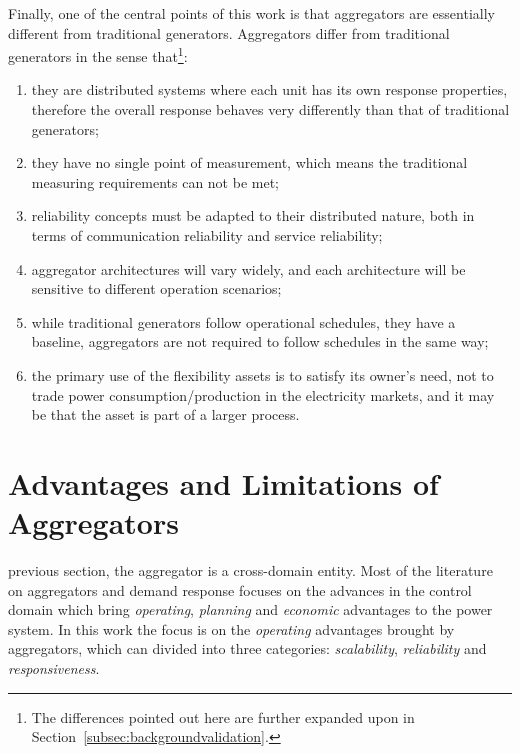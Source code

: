 Finally, one of the central points of this work is that aggregators are essentially different from traditional generators. Aggregators differ from traditional generators in the sense that\footnote{The differences pointed out here are further expanded upon in Section~\ref{subsec:backgroundvalidation}.}:
\begin{enumerate}
	\item they are distributed systems where each unit has its own response properties, therefore the overall response behaves very differently than that of traditional generators;\label{point:aggblackbox}
	\item they have no single point of measurement, which means the traditional measuring requirements can not be met;
	\item reliability concepts must be adapted to their distributed nature, both in terms of communication reliability and service reliability;
	\item aggregator architectures will vary widely, and each architecture will be sensitive to different operation scenarios;
	\item while traditional generators follow operational schedules, \ie they have a baseline, aggregators are not required to follow schedules in the same way;
	\item the primary use of the flexibility assets is to satisfy its owner's need, not to trade power consumption/production in the electricity markets, and it may be that the asset is part of a larger process.
\end{enumerate}

\section{Advantages and Limitations of Aggregators}
 previous section, the aggregator is a cross-domain entity. Most of the literature on aggregators and demand response focuses on the advances in the control domain which bring \emph{operating}, \emph{planning} and \emph{economic} advantages to the power system. In this work the focus is on the \emph{operating} advantages brought by aggregators, which can divided into three categories: \emph{scalability}, \emph{reliability} and \emph{responsiveness}.

